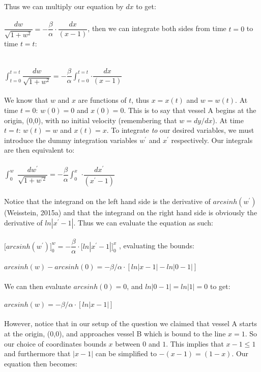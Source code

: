 \documentclass[12pt]{article}
\begin{document}
	\indent Thus we can multiply our equation by $dx$ to get:
	\\
	\\
	$\dfrac{dw}{\sqrt{ 1 + w^{2}}}=-\dfrac{\beta}{\alpha}\cdot\dfrac{dx}{(x-1)}$\hspace{1cm}, then we can integrate both sides from time $t=0$ to time $t=t$: 
	\\
	\\
	\\
	{\Large $\int^{t=t}_{t=0}$}$\dfrac{dw}{\sqrt{ 1 +  w^{2}}}=-\dfrac{\beta}{\alpha}${\Large $\int^{t=t}_{t=0}$}$\cdot\dfrac{dx}{(x-1)}$ 
	\\
	\\
	\indent We know that $w$ and $x$ are functions of $t$, thus $x=x(t)$ and $w=w(t)$. At time $t=0$: $w(0)=0$ and $x(0)=0$. This is to say that vessel A begins at the origin, (0,0), with no initial velocity (remembering that $w=dy/dx$). At time $t=t$: $w(t)=w$ and $x(t)=x$. To integrate \textit{to} our desired variables, we must introduce the dummy integration variables $w^{\prime}$ and $x^{\prime}$ respectively. Our integrals are then equivalent to:
	\\
	\\
	{\Large $\int^w_0$} $\dfrac{dw^{\prime}}{\sqrt{ 1 + w^{\prime 2}}}=-\dfrac{\beta}{\alpha}${\Large $\int^x_0$} $\cdot\dfrac{dx^{\prime}}{(x^{\prime}-1)}$ 
	\\
	\\
	\indent Notice that the integrand on the left hand side is the derivative of $arcsinh(w^{\prime})$ (Weisstein, 2015a) and that the integrand on the right hand side is obviously the derivative of $ln|x^{\prime}-1|$. Thus we can evaluate the equation as such:
	\\
	\\
	$\bigg[arcsinh(w^{\prime})\bigg]^w_0=-\dfrac{\beta}{\alpha}\cdot \bigg[ln|x^{\prime}-1| \bigg]^x_0$ \hspace{1cm}, evaluating the bounds: 
	\\
	\\
	$arcsinh(w)-arcsinh(0)=-\beta/\alpha\cdot [ln|x-1|-ln|0-1|]$ 
	\\
	\\ 
	\indent We can then evaluate $arcsinh(0)=0$, and $ln|0-1|=ln|1|=0$ to get:
	\\
	\\
	$arcsinh(w)=-\beta/\alpha\cdot [ln|x-1|]$ 
	\\
	\\
	\indent However, notice that in our setup of the question we claimed that vessel A starts at the origin, (0,0), and approaches vessel B which is bound to the line $x=1$. So our choice of coordinates bounds $x$ between $0$ and $1$. This implies that $x-1\leq1$ and furthermore that $|x-1|$ can be simplified to $-(x-1)=(1-x)$. Our equation then becomes:
\end{document}
